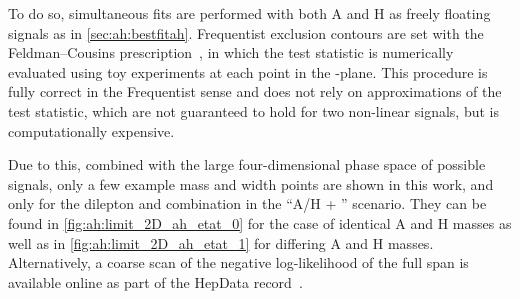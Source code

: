 To do so, simultaneous fits are performed with both A and H as freely floating signals as in \cref{sec:ah:bestfitah}. Frequentist exclusion contours are set with the Feldman--Cousins prescription~\cite{Feldman:1997qc,Cousins:1991qz}, in which the test statistic is numerically evaluated using toy experiments at each point in the \gAtt-\gHtt plane. This procedure is fully correct in the Frequentist sense and does not rely on approximations of the test statistic, which are not guaranteed to hold for two non-linear signals, but is computationally expensive.

Due to this, combined with the large four-dimensional phase space of possible signals, only a few example mass and width points are shown in this work, and only for the dilepton and \ljets combination in the ``A/H + \etat'' scenario. They can be found in \cref{fig:ah:limit_2D_ah_etat_0} for the case of identical A and H masses as well as in \cref{fig:ah:limit_2D_ah_etat_1} for differing A and H masses. Alternatively, a coarse scan of the negative log-likelihood of the full span is available online as part of the HepData record~\cite{CMS:HIG-22-013-hepdata}.


